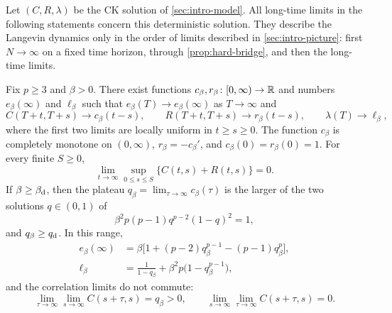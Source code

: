 Let $(C,R,\lambda)$ be the CK solution of \cref{sec:intro-model}. All long-time limits in the following statements concern this deterministic solution. They describe the Langevin dynamics only in the order of limits described in \cref{sec:intro-picture}: first $N\to\infty$ on a fixed time horizon, through \cref{prop:hard-bridge}, and then the long-time limits.

\begin{theorem}\label{thm:main-aging}
Fix $p\ge3$ and $\beta>0$. There exist functions $c_\beta,r_\beta\colon[0,\infty)\to\mathbb R$ and numbers $e_\beta(\infty)$ and $\ell_\beta$ such that $e_\beta(T)\to e_\beta(\infty)$ as $T\to\infty$ and
\begin{equation}
 C(T+t,T+s)\longrightarrow c_\beta(t-s),\qquad
 R(T+t,T+s)\longrightarrow r_\beta(t-s),\qquad
 \lambda(T)\longrightarrow\ell_\beta,
 \label{eq:main-stationary}
\end{equation}
where the first two limits are locally uniform in $t\ge s\ge0$. The function $c_\beta$ is completely monotone on $(0,\infty)$, $r_\beta=-c_\beta'$, and $c_\beta(0)=r_\beta(0)=1$. For every finite $S\ge0$,
\begin{equation}
 \lim_{t\to\infty}\sup_{0\le s\le S}\bigl\{C(t,s)+R(t,s)\bigr\}=0.
 \label{eq:main-forgetting}
\end{equation}
If $\beta\ge\beta_{\mathrm d}$, then the plateau $q_\beta=\lim_{\tau\to\infty}c_\beta(\tau)$ is the larger of the two solutions $q\in(0,1)$ of
\begin{equation}
 \beta^2p(p-1)q^{p-2}(1-q)^2=1,
 \label{eq:main-marginality}
\end{equation}
and $q_\beta\ge q_{\mathrm d}$. In this range,
\begin{align}
 e_\beta(\infty)
 &=\beta\bigl[1+(p-2)q_\beta^{p-1}-(p-1)q_\beta^p\bigr],
 \label{eq:main-energy}\\
 \ell_\beta
 &=\frac1{1-q_\beta}+\beta^2p\bigl(1-q_\beta^{p-1}\bigr),
 \label{eq:main-multiplier}
\end{align}
and the correlation limits do not commute:
\begin{equation}
 \lim_{\tau\to\infty}\lim_{s\to\infty}C(s+\tau,s)=q_\beta>0,
 \qquad
 \lim_{s\to\infty}\lim_{\tau\to\infty}C(s+\tau,s)=0.
 \label{eq:main-aging}
\end{equation}
\end{theorem}

